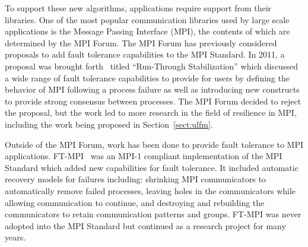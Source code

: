 
To support these new algorithms, applications require support from their
libraries. One of the most popular communication libraries used by large scale
applications is the Message Passing Interface (MPI), the contents of which are
determined by the MPI Forum. The MPI Forum has previously considered proposals
to add fault tolerance capabilities to the MPI Standard. In 2011, a proposal was
brought forth~\cite{Hursey2011RTS} titled ``Run-Through Stabilization'' which
discussed a wide range of fault tolerance capabilities to provide for users by
defining the behavior of MPI following a process failure as well as introducing
new constructs to provide strong consensus between processes. The MPI Forum
decided to reject the proposal, but the work led to more research in the field
of resilience in MPI, including the work being proposed in
Section~\ref{sect:ulfm}.


Outside of the MPI Forum, work has been done to provide fault tolerance to MPI
applications. FT-MPI~\cite{FaggFTMPI} was an MPI-1 compliant implementation of
the MPI Standard which added new capabilities for fault tolerance. It included
automatic recovery models for failures including: shrinking MPI communicators to
automatically remove failed processes, leaving holes in the communicators while
allowing communication to continue, and destroying and rebuilding the
communicators to retain communication patterns and groups. FT-MPI was never
adopted into the MPI Standard but continued as a research project for many
years. 
